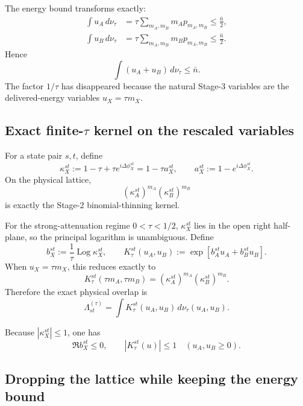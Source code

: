 \documentclass[11pt]{article}
\theoremstyle{remark}
\begin{document}
The energy bound transforms exactly:
\begin{align}
    \int u_A\,d\nu_\tau
    &=
    \tau\sum_{m_A,m_B}m_Ap_{m_A,m_B}
    \le\frac{\bar n}{2},
    \\
    \int u_B\,d\nu_\tau
    &=
    \tau\sum_{m_A,m_B}m_Bp_{m_A,m_B}
    \le\frac{\bar n}{2}.
    \label{eq:stage3-perarm-energy}
\end{align}
Hence
\begin{equation}
    \int(u_A+u_B)\,d\nu_\tau
    \le\bar n.
    \label{eq:stage3-energy}
\end{equation}
The factor \(1/\tau\) has disappeared because the natural Stage-3 variables
are the delivered-energy variables \(u_X=\tau m_X\).

\subsection{Exact finite-\texorpdfstring{\(\tau\)}{tau} kernel on the rescaled variables}

For a state pair \(s,t\), define
\[
    \kappa_X^{st}
    :=
    1-\tau+\tau e^{i\Delta\phi_X^{st}}
    =
    1-\tau a_X^{st},
    \qquad
    a_X^{st}:=1-e^{i\Delta\phi_X^{st}}.
\]
On the physical lattice,
\[
    (\kappa_A^{st})^{m_A}(\kappa_B^{st})^{m_B}
\]
is exactly the Stage-2 binomial-thinning kernel.

For the strong-attenuation regime \(0<\tau<1/2\),
\(\kappa_X^{st}\) lies in the open right half-plane, so the principal logarithm
is unambiguous.  Define
\begin{equation}
    b_X^{st}
    :=
    \frac{1}{\tau}\operatorname{Log}\kappa_X^{st},
    \qquad
    \boxed{
    K_\tau^{st}(u_A,u_B)
    :=
    \exp\!\left[
      b_A^{st}u_A+b_B^{st}u_B
    \right].
    }
    \label{eq:stage3-finite-kernel}
\end{equation}
When \(u_X=\tau m_X\), this reduces exactly to
\[
    K_\tau^{st}(\tau m_A,\tau m_B)
    =
    (\kappa_A^{st})^{m_A}(\kappa_B^{st})^{m_B}.
\]
Therefore the exact physical overlap is
\begin{equation}
    \boxed{
    \Lambda^{(\tau)}_{st}
    =
    \int
      K_\tau^{st}(u_A,u_B)
      \,d\nu_\tau(u_A,u_B).
    }
    \label{eq:stage3-exact-integral}
\end{equation}

Because \(|\kappa_X^{st}|\le1\), one has
\[
    \Re b_X^{st}\le0,
    \qquad
    |K_\tau^{st}(u)|\le1
    \quad
    (u_A,u_B\ge0).
\]

\subsection{Dropping the lattice while keeping the energy bound}
\end{document}
